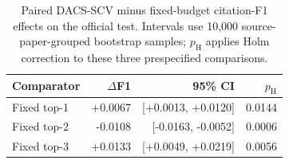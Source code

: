 \begin{table}[t]
\centering
\caption{Paired DACS-SCV minus fixed-budget citation-F1 effects on the official test. Intervals use 10,000 source-paper-grouped bootstrap samples; $p_{\mathrm{H}}$ applies Holm correction to these three prespecified comparisons.}
\label{tab:fixed-effects}
\scriptsize
\setlength{\tabcolsep}{3pt}
\begin{tabular}{@{}lrrr@{}}
\toprule
Comparator & $\Delta$F1 & 95\% CI & $p_{\mathrm{H}}$ \\
\midrule
Fixed top-1 & +0.0067 & [+0.0013, +0.0120] & 0.0144 \\
Fixed top-2 & -0.0108 & [-0.0163, -0.0052] & 0.0006 \\
Fixed top-3 & +0.0133 & [+0.0049, +0.0219] & 0.0056 \\
\bottomrule
\end{tabular}
\end{table}
